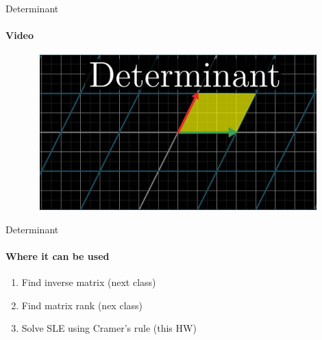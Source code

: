\documentclass[aspectratio=169,notes]{beamer}
\begin{document}
\begin{frame}[t]{Determinant}
    \framesubtitle{Video}
    \vspace{-0.6cm}
    \begin{figure}[H]
        \href{https://youtu.be/Ip3X9LOh2dk}{
            \centering\includegraphics[height=6cm,width=1\textwidth,keepaspectratio]{det_brown.jpg}}
        \label{fig:det_brown.jpg}
    \end{figure}
\end{frame}

\begin{frame}[t]{Determinant}
\framesubtitle{Where it can be used}
    \begin{enumerate}
        \item Find inverse matrix (next class)
        \item Find matrix rank (nex class)
        \item Solve SLE using Cramer's rule (this HW)
    \end{enumerate}
\end{frame}
\end{document}
